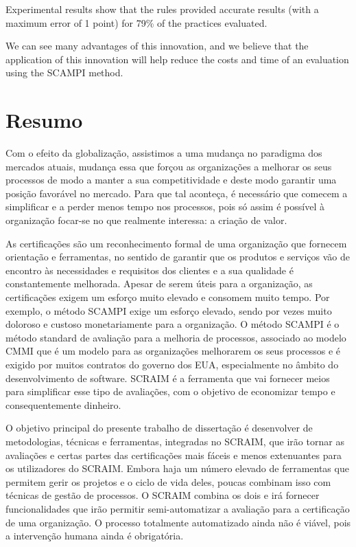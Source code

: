 Experimental results show that the rules provided accurate results (with a maximum error of 1 point) for 79\% of the practices evaluated.

We can see many advantages of this innovation, and we believe that the application of this innovation will help reduce the costs and time of an evaluation using the SCAMPI method.


\chapter*{Resumo}
Com o efeito da globalização, assistimos a uma mudança no paradigma dos mercados atuais, mudança essa que forçou as organizações a melhorar os seus processos de modo a manter a sua competitividade e deste modo garantir uma posição favorável no mercado. Para que tal aconteça, é necessário que comecem a simplificar e a perder menos tempo nos processos, pois só assim é possível à organização focar-se no que realmente interessa: a criação de valor.

As certificações são um reconhecimento formal de uma organização que fornecem orientação e ferramentas, no sentido de garantir que os produtos e serviços vão de encontro às necessidades e requisitos dos clientes e a sua qualidade é constantemente melhorada. Apesar de serem úteis para a organização, as certificações exigem um esforço muito elevado e consomem muito tempo. Por exemplo, o método SCAMPI exige um esforço elevado, sendo por vezes muito doloroso e custoso monetariamente para a organização.
O método SCAMPI é o método standard de avaliação para a melhoria de processos, associado ao modelo CMMI que é um modelo para as organizações melhorarem os seus processos e é exigido por muitos contratos do governo dos EUA, especialmente no âmbito do desenvolvimento de software. SCRAIM é a ferramenta que vai fornecer meios para simplificar esse tipo de avaliações, com o objetivo de economizar tempo e consequentemente dinheiro.

O objetivo principal do presente trabalho de dissertação é desenvolver de metodologias, técnicas e ferramentas, integradas no SCRAIM, que irão tornar as avaliações e certas partes das certificações mais fáceis e menos extenuantes para os utilizadores do SCRAIM.
Embora haja um número elevado de ferramentas que permitem gerir os projetos e o ciclo de vida deles, poucas combinam isso com técnicas de gestão de processos. O SCRAIM combina os dois e irá fornecer funcionalidades que irão permitir semi-automatizar a avaliação para a certificação de uma organização. O processo totalmente automatizado ainda não é viável, pois a intervenção humana ainda é obrigatória.

